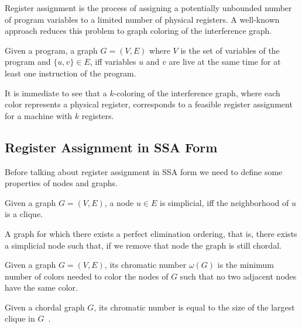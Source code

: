 Register assignment is the process of assigning a potentially unbounded number of program variables to a limited number of physical registers. A well-known approach reduces this problem to graph coloring of the interference graph.

\begin{definition}\label{def:ig}
    Given a program, a graph $G = (V, E)$ where $V$ is the set of variables of the program and $\{ u, v \} \in E$, iff variables $u$ and $v$ are live at the same time for at least one instruction of the program.
\end{definition}

It is immediate to see that a $k$-coloring of the interference graph, where each color represents a physical register, corresponds to a feasible register assignment for a machine with $k$ registers.

\subsection{Register Assignment in SSA Form}
\label{subsec:ssara}

Before talking about register assignment in SSA form we need to define some properties of nodes and graphs.

\begin{definition}\label{def:simplicial}
    Given a graph $G = (V, E)$, a node $u \in E$ is simplicial, iff the neighborhood of $u$ is a clique.
\end{definition}

\begin{definition}\label{def:chordal}
    A graph for which there exists a perfect elimination ordering, that is, there exists a simplicial node such that, if we remove that node the graph is still chordal.
\end{definition}

\begin{definition}\label{def:chromatic}
    Given a graph $G = (V, E)$, its chromatic number $\omega(G)$ is the minimum number of colors needed to color the nodes of $G$ such that no two adjacent nodes have the same color.
\end{definition}

\begin{theorem}\label{thm:chordal-chromatic}
    Given a chordal graph $G$, its chromatic number is equal to the size of the largest clique in $G$~\cite{...}.
\end{theorem}

